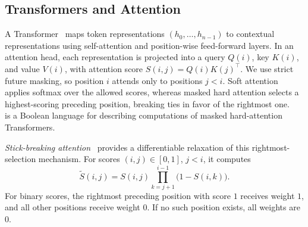 
\subsection{Transformers and Attention}
\label{sec:attention-background}
A Transformer~\citep{transformers} maps token representations
$(h_0,\ldots,h_{n-1})$ to contextual representations using self-attention and position-wise feed-forward layers. 
In an attention head, each representation
is projected into a query $Q(i)$, key $K(i)$, and value $V(i)$, with attention
score $S(i,j)=Q(i)K(j)^\top$.
We use strict future masking, so position $i$ attends only to positions $j<i$. Soft attention applies softmax over the allowed scores, whereas masked hard attention selects a highest-scoring preceding position, breaking ties in favor of the rightmost one.
 \brasp~\citep{yang2024masked} is a Boolean language for describing computations of masked hard-attention Transformers.

\emph{Stick-breaking attention}~\citep{tan2025scaling} provides a
differentiable relaxation of this rightmost-selection mechanism. For scores $(i,j)\in[0,1]$, $j<i$, it computes
\[
\widetilde S(i,j)
=
S(i,j)
\prod_{k=j+1}^{i-1}
\bigl(1-S(i,k)\bigr).
\]
For binary scores, the rightmost preceding position with score $1$ receives weight $1$, and all other positions receive weight $0$. If no such position exists, all weights are $0$.